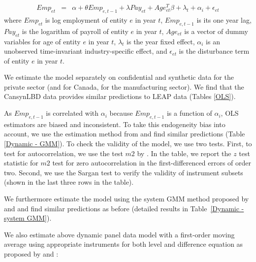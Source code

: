 \begin{eqnarray}	
\label{eq:OLS}
Emp_{et} & = & \alpha + \theta Emp_{e,t-1} + \lambda Pay_{et} + Age_{et}^{T}\beta + \lambda_t + \alpha_i + \epsilon_{et}
\end{eqnarray}
where $Emp_{et}$ is log employment of entity $e$ in year $t$, $Emp_{e,t-1}$ is its one year lag, $Pay_{et}$ is the logarithm of payroll of entity $e$ in year $t$, $Age_{et}$ is a vector of dummy variables for age of entity $e$ in year $t$, $\lambda_t$ is the year fixed effect, $\alpha_i$ is an unobserved time-invariant industry-specific effect, and $\epsilon_{et}$ is the disturbance term of entity $e$ in year $t$. 

We estimate the model separately on confidential and synthetic data for the private sector (and for Canada, for the manufacturing sector). We find that the CansynLBD data provides similar predictions to LEAP data (Tables  \ref{OLS}). 



As $Emp_{e,t-1}$ is correlated with $\alpha_{i}$ because $Emp_{e,t-1}$ is a function of $\alpha_{i}$, 
OLS estimators are biased and inconsistent. 
To take this endogeneity bias into account, we use the estimation method from \textcite{RePEc:oup:restud:v:58:y:1991:i:2:p:277-297.} and find similar predictions (Table \ref{Dynamic - GMM}). To check the validity of the model, we use two tests. First, to test for autocorrelation, we use the test $m2$ by \textcite{RePEc:oup:restud:v:58:y:1991:i:2:p:277-297.}. In the table, we report the $z$ test statistic for $m2$ test for zero autocorrelation in the  first-differenced errors of order two. Second, we use the Sargan test to verify the validity of instrument subsets (shown in the last three rows in the table).

We furthermore estimate the model using the system GMM  method proposed by \textcite{RePEc:eee:econom:v:68:y:1995:i:1:p:29-51} and \textcite{RePEc:eee:econom:v:87:y:1998:i:1:p:115-143} and find similar predictions as before (detailed results in Table~\ref{Dynamic - system GMM}). 

We also estimate above dynamic panel data model with a first-order moving average using appropriate instruments for both level and difference equation as proposed by \textcite{RePEc:eee:econom:v:68:y:1995:i:1:p:29-51} and \textcite{RePEc:eee:econom:v:87:y:1998:i:1:p:115-143}:

